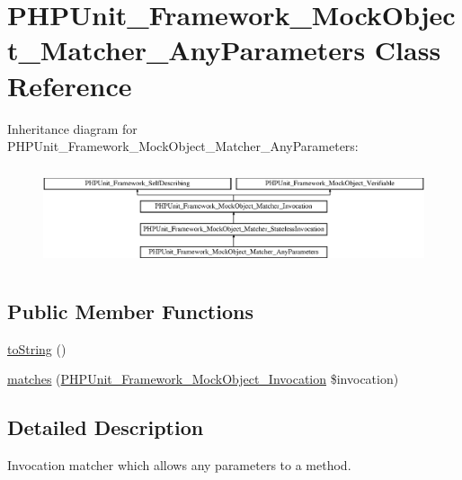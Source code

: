\hypertarget{class_p_h_p_unit___framework___mock_object___matcher___any_parameters}{}\section{P\+H\+P\+Unit\+\_\+\+Framework\+\_\+\+Mock\+Object\+\_\+\+Matcher\+\_\+\+Any\+Parameters Class Reference}
\label{class_p_h_p_unit___framework___mock_object___matcher___any_parameters}
Inheritance diagram for P\+H\+P\+Unit\+\_\+\+Framework\+\_\+\+Mock\+Object\+\_\+\+Matcher\+\_\+\+Any\+Parameters\+:\begin{figure}[H]
\begin{center}
\leavevmode
\includegraphics[height=2.947368cm]{class_p_h_p_unit___framework___mock_object___matcher___any_parameters}
\end{center}
\end{figure}
\subsection*{Public Member Functions}
\begin{DoxyCompactItemize}
\item 
\mbox{\hyperlink{class_p_h_p_unit___framework___mock_object___matcher___any_parameters_a5558c5d549f41597377fa1ea8a1cefa3}{to\+String}} ()
\item 
\mbox{\hyperlink{class_p_h_p_unit___framework___mock_object___matcher___any_parameters_a4988c6fa11e275302172d0a4ae32dd3a}{matches}} (\mbox{\hyperlink{interface_p_h_p_unit___framework___mock_object___invocation}{P\+H\+P\+Unit\+\_\+\+Framework\+\_\+\+Mock\+Object\+\_\+\+Invocation}} \$invocation)
\end{DoxyCompactItemize}


\subsection{Detailed Description}
Invocation matcher which allows any parameters to a method.

